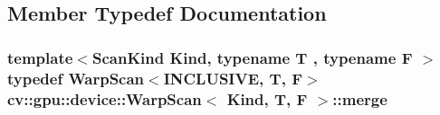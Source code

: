\subsection{Member Typedef Documentation}
\hypertarget{structcv_1_1gpu_1_1device_1_1WarpScan_acf969950d6f4c09c21ae86b0e7a64580}{
\subsubsection[{merge}]{\setlength{\rightskip}{0pt plus 5cm}template$<$Scan\-Kind Kind, typename T , typename F $>$ typedef {\bf Warp\-Scan}$<${\bf I\-N\-C\-L\-U\-S\-I\-V\-E}, {\bf T}, {\bf F}$>$ {\bf cv\-::gpu\-::device\-::\-Warp\-Scan}$<$ Kind, {\bf T}, {\bf F} $>$\-::{\bf merge}}}\label{structcv_1_1gpu_1_1device_1_1WarpScan_acf969950d6f4c09c21ae86b0e7a64580}


